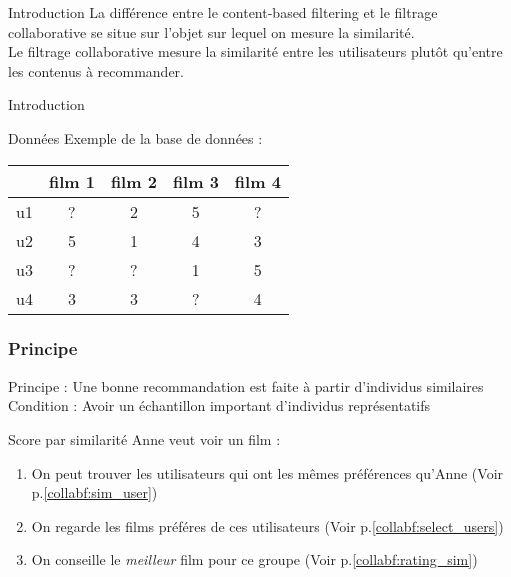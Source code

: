 \begin{frame}{Introduction}
  La différence entre le content-based filtering et le filtrage collaborative se situe sur l'objet sur lequel on mesure la similarité.\\[2ex]

  Le \alert{filtrage collaborative} mesure la similarité entre les utilisateurs plutôt qu'entre les contenus à recommander.
\end{frame}
\begin{frame}{Introduction}
\end{frame}

\begin{frame}{Données}
  Exemple de la base de données :
  \begin{center}
  \begin{tabular}{|l|c|c|c|c|}
    \hline
     & film 1 & film 2 & film 3 & film 4 \\
    \hline
    u1 & ? & 2 & 5 & ? \\
    \hline
    u2 & 5 & 1 & 4 & 3 \\
    \hline
    u3 & ? & ? & 1 & 5 \\
    \hline
    u4 & 3 & 3 & ? & 4 \\
    \hline
  \end{tabular}
  \end{center}
\end{frame}

\begin{frame}
  \frametitle{Principe}
  Principe : Une bonne recommandation est faite à partir d'individus similaires\\
  \newline
  Condition : Avoir un échantillon important d'individus représentatifs
\end{frame}

\begin{frame}{Score par similarité}
  Anne veut voir un film :
  \begin{enumerate}
    \item On peut trouver les utilisateurs qui ont les mêmes préférences qu'Anne (Voir p.\ref{collabf:sim_user})
    \item On regarde les films préféres de ces utilisateurs (Voir p.\ref{collabf:select_users}) 
    \item On conseille le \og \textit{meilleur}\fg{} film pour ce groupe (Voir p.\ref{collabf:rating_sim})  
  \end{enumerate}

\end{frame}

